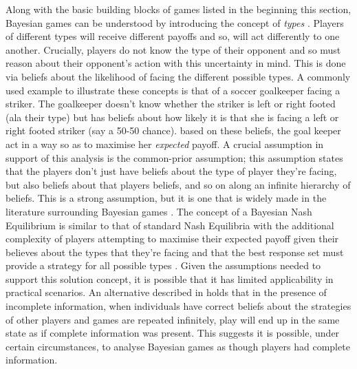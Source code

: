 \documentclass[11pt]{article}
\newcommand*{\np}{\par\noindent\newline}
\begin{document}
\np Along with the basic building blocks of games listed in the beginning this section, Bayesian games can be understood
by introducing the concept of \textit{types} \citep[~p. 167]{shoham_multiagent_2008}. Players of different types will
receive different payoffs and so, will act differently to one another. Crucially, players do not know the type of their
opponent and so must reason about their opponent's action with this uncertainty in mind. This is done via beliefs about
the likelihood of facing the different possible types. A commonly used example to illustrate these concepts is that of a
soccer goalkeeper facing a striker. The goalkeeper doesn't know whether the striker is left or right footed (ala their
type) but has beliefs about how likely it is that she is facing a left or right footed striker (say a 50-50 chance).
based on these beliefs, the goal keeper act in a way so as to maximise her \textit{expected} payoff. A crucial
assumption in support of this analysis is the common-prior assumption; this assumption states that the players don't
just have beliefs about the type of player they're facing, but also beliefs about that players beliefs, and so on along
an infinite hierarchy of beliefs. This is a strong assumption, but it is one that is widely made in the literature
surrounding Bayesian games \citep[~p. 164]{shoham_multiagent_2008}. The concept of a Bayesian Nash Equilibrium is
similar to that of standard Nash Equilibria with the additional complexity of players attempting to maximise their
expected payoff given their believes about the types that they're facing and that the best response set must provide a
strategy for all possible types \citet{shoham_multiagent_2008}. Given the assumptions needed to support this solution
concept, it is possible that it has limited applicability in practical scenarios.
An alternative described in \citet{kalai_rational_1993} holds that in the presence of incomplete information, when
individuals have correct beliefs about the strategies of other players and games are repeated infinitely, play will end
up in the same state as if complete information was present. This suggests it is possible, under certain circumstances,
to analyse Bayesian games as though players had complete information.
\end{document}
